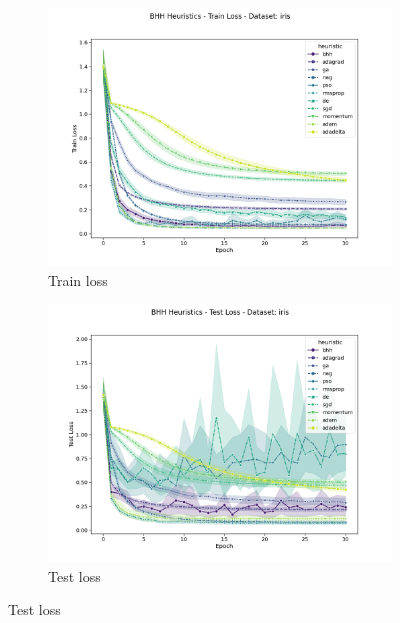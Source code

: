\begin{figure}[htbp]
	\begin{subfigure}{0.5\textwidth}
    	\centering
        \includegraphics[width=\textwidth]{analysis/standalone/figures/train/loss/iris.png}
        \caption{Train loss}
        \label{fig:results:standalone:figures:loss:train:iris}
	\end{subfigure}
	\begin{subfigure}{0.5\textwidth}
    	\centering
        \includegraphics[width=\textwidth]{analysis/standalone/figures/test/loss/iris.png}
        \caption{Test loss}
        \label{fig:results:standalone:figures:loss:test:iris}
	\end{subfigure}
	\par\bigskip

\end{figure}

